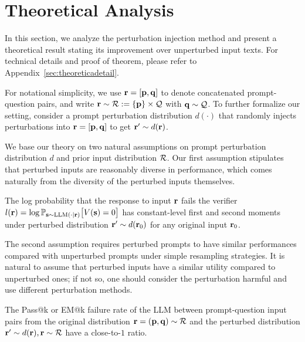 \vspace{-0.3cm}
\section{Theoretical Analysis}\label{sec:theoretical}
\vspace{-0.2cm}
In this section, we analyze the perturbation injection method and present a theoretical result stating its improvement over unperturbed input texts. For technical details and proof of theorem, please refer to Appendix~\ref{sec:theoreticadetail}. 

For notational simplicity, we use $\mathbf{r} = [\mathbf{p}, \mathbf{q}]$ to denote concatenated prompt-question pairs, and write $\mathbf{r} \sim \mathcal{R} := \{ \mathbf{p} \} \times \mathcal{Q}$ with $\mathbf{q} \sim \mathcal{Q}$. To further formalize our setting, consider a prompt perturbation distribution $d(\cdot)$ that randomly injects perturbations into $\mathbf{r} = [\mathbf{p}, \mathbf{q}]$ to get $\mathbf{r}' \sim d(\mathbf{r})$. 

We base our theory on two natural assumptions on prompt perturbation distribution $d$ and prior input distribution $\mathcal{R}$. Our first assumption stipulates that perturbed inputs are reasonably diverse in performance, which comes naturally from the diversity of the perturbed inputs themselves. 
\begin{assumption} \label{asmp: varied response}
The log probability that the response to input $\mathbf{r}$ fails the verifier 
$ l(\mathbf{r}) = \log \mathbb{P}_{\mathbf{s} \sim \text{LLM} (\cdot|\mathbf{r})} \big[V(\mathbf{s}) = 0 \big] $
has constant-level first and second moments under perturbed distribution $\mathbf{r}' \sim d(\mathbf{r}_0)$ for any original input $\mathbf{r}_0$. 
\end{assumption}
The second assumption requires perturbed prompts to have similar performances compared with unperturbed prompts under simple resampling strategies. It is natural to assume that perturbed inputs have a similar utility compared to unperturbed ones; if not so, one should consider the perturbation harmful and use different perturbation methods. 
\begin{assumption} \label{asmp: similar utility}
The Pass@k or EM@k failure rate of the LLM between prompt-question input pairs from the original distribution $\mathbf{r} = (\mathbf{p}, \mathbf{q}) \sim \mathcal{R}$ and the perturbed distribution $\mathbf{r}' \sim d(\mathbf{r}), \mathbf{r} \sim \mathcal{R}$ have a close-to-$1$ ratio. 
\end{assumption}

